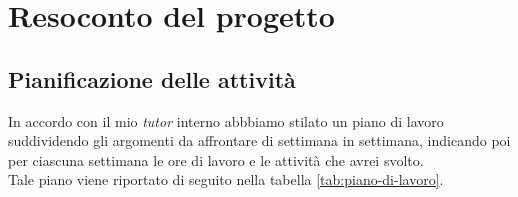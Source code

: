 
\chapter{Resoconto del progetto}
\label{cap:resoconto-progetto}


\section{Pianificazione delle attività}
In accordo con il mio \emph{tutor} interno abbbiamo stilato un piano di lavoro suddividendo gli argomenti da affrontare di settimana in settimana, indicando poi per ciascuna settimana
le ore di lavoro e le attività che avrei svolto. \\
Tale piano viene riportato di seguito nella tabella \ref{tab:piano-di-lavoro}.

